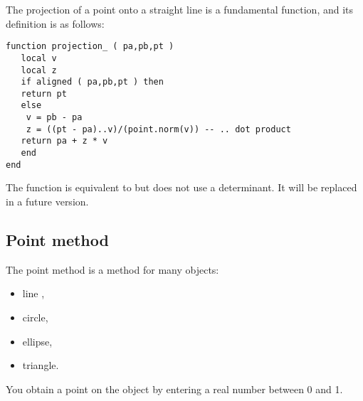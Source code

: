 The projection of a point onto a straight line is a fundamental function, and its definition is as follows:

\begin{Verbatim}
function projection_ ( pa,pb,pt )
   local v
   local z
   if aligned ( pa,pb,pt ) then
   return pt
   else
    v = pb - pa
    z = ((pt - pa)..v)/(point.norm(v)) -- .. dot product
   return pa + z * v  
   end
end
\end{Verbatim}

The function   is equivalent to    but does not use a determinant. It will be replaced in a future version.


\subsection{Point method} %
\label{sub:point_method}

The point  method is a method for many objects: 
\begin{itemize}
 \item line ,
 \item circle,
 \item ellipse,
 \item triangle.
\end{itemize}

You obtain a point on the object by entering a real number between 0 and 1. 

